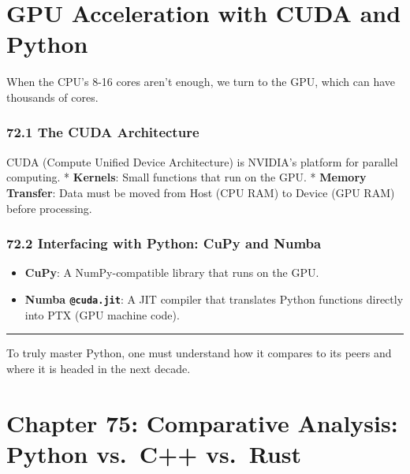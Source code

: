 \hypertarget{gpu-acceleration-with-cuda-and-python}{%
\chapter{GPU Acceleration with CUDA and
Python}\label{gpu-acceleration-with-cuda-and-python}}

When the CPU's 8-16 cores aren't enough, we turn to the GPU, which can
have thousands of cores.

\hypertarget{the-cuda-architecture}{%
\subsection{72.1 The CUDA Architecture}\label{the-cuda-architecture}}

CUDA (Compute Unified Device Architecture) is NVIDIA's platform for
parallel computing. * \textbf{Kernels}: Small functions that run on the
GPU. * \textbf{Memory Transfer}: Data must be moved from Host (CPU RAM)
to Device (GPU RAM) before processing.

\hypertarget{interfacing-with-python-cupy-and-numba}{%
\subsection{72.2 Interfacing with Python: CuPy and
Numba}\label{interfacing-with-python-cupy-and-numba}}

\begin{itemize}
\tightlist
\item
  \textbf{CuPy}: A NumPy-compatible library that runs on the GPU.
\item
  \textbf{Numba \passthrough{\lstinline!@cuda.jit!}}: A JIT compiler
  that translates Python functions directly into PTX (GPU machine code).
\end{itemize}

\begin{center}\rule{0.5\linewidth}{0.5pt}\end{center}

To truly master Python, one must understand how it compares to its peers
and where it is headed in the next decade.

\hypertarget{chapter-75-comparative-analysis-python-vs.-c-vs.-rust}{%
\chapter{Chapter 75: Comparative Analysis: Python vs.~C++
vs.~Rust}\label{chapter-75-comparative-analysis-python-vs.-c-vs.-rust}}


